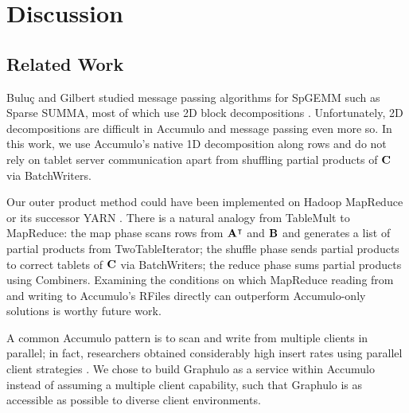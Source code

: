 
\section{Discussion}
\label{sDiscussion}

\subsection{Related Work} %
Bulu\c{c} and Gilbert studied message passing algorithms for SpGEMM
such as Sparse SUMMA, most of which use 2D block decompositions \cite{buluc2012parallel}.
Unfortunately, 2D decompositions are difficult in Accumulo 
and message passing even more so.
In this work, we use Accumulo's native 1D decomposition along rows 
and do not rely on tablet server communication
apart from shuffling partial products of $\mathbf{C}$ via BatchWriters.


Our outer product method could have been implemented on Hadoop MapReduce %
 or its successor YARN \cite{vavilapalli2013apache}.
There is a natural analogy from TableMult to MapReduce:
the map phase scans rows from $\mathbf{A^{\intercal}}$ and $\mathbf{B}$
and generates a list of partial products from TwoTableIterator;
the shuffle phase sends partial products to correct tablets of $\mathbf{C}$ via BatchWriters;
the reduce phase sums partial products using Combiners.
Examining the conditions on which MapReduce 
reading from and writing to Accumulo's RFiles directly
can outperform Accumulo-only solutions
is worthy future work.


A common Accumulo pattern is to 
scan and write from multiple clients in parallel;
in fact, researchers obtained 
considerably high insert rates using parallel client strategies \cite{kepner2014achieving}.
We chose to build Graphulo as a service within Accumulo
instead of assuming a multiple client capability,
such that Graphulo is as accessible as possible to diverse client environments.

